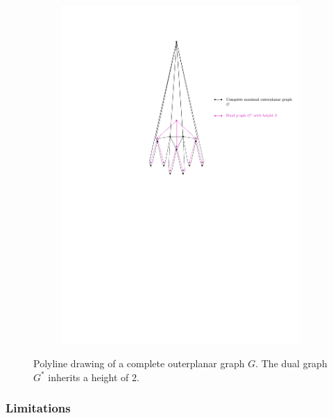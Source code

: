 	\begin{figure}[H]
	\centering
	\begin{subfigure}{\textwidth}
		\centering
		\includegraphics[page=1,width=0.7\linewidth]{graphics/complete_maximal_outerplanar_weak_dual_graph_example_drawing.pdf}
	\end{subfigure}
	\caption{Polyline drawing of a complete outerplanar graph $G$. The dual graph $G^*$ inherits a height of 2.}
\end{figure}


\subsubsection{Limitations}

